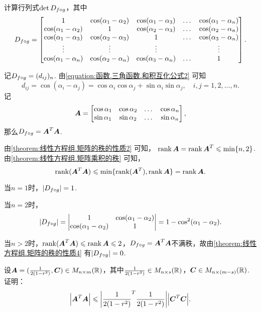 \begin{example}
计算行列式\(\det D_{f \circ g}\)，其中\[
D_{f \circ g} = \begin{bmatrix}
1 & \cos(\alpha_1-\alpha_2) & \cos(\alpha_1-\alpha_3) & \dots & \cos(\alpha_1-\alpha_n) \\
\cos(\alpha_1-\alpha_2) & 1 & \cos(\alpha_2-\alpha_3) & \dots & \cos(\alpha_2-\alpha_n) \\
\cos(\alpha_1-\alpha_3) & \cos(\alpha_2-\alpha_3) & 1 & \dots & \cos(\alpha_3-\alpha_n) \\
\vdots & \vdots & \vdots & & \vdots \\
\cos(\alpha_1-\alpha_n) & \cos(\alpha_2-\alpha_n) & \cos(\alpha_3-\alpha_n) & \dots & 1
\end{bmatrix}.
\]
\begin{solution}
记\(D_{f \circ g} = (d_{ij})_n\).
由\cref{equation:函数.三角函数.和积互化公式2} 可知\[
d_{ij} = \cos(\alpha_i-\alpha_j)
= \cos\alpha_i\cos\alpha_j+\sin\alpha_i\sin\alpha_j,
\quad i,j=1,2,\dotsc,n.
\]记\[
\boldsymbol{A} = \begin{bmatrix}
\cos\alpha_1 & \cos\alpha_2 & \dots & \cos\alpha_n \\
\sin\alpha_1 & \sin\alpha_2 & \dots & \sin\alpha_n
\end{bmatrix},
\]那么\(D_{f \circ g} = \boldsymbol{A}^T \boldsymbol{A}\).

由\cref{theorem:线性方程组.矩阵的秩的性质2} 可知，%
\(\rank\boldsymbol{A} = \rank\boldsymbol{A}^T \leqslant \min\{n,2\}\).
由\cref{theorem:线性方程组.矩阵乘积的秩} 可知，\[
\rank(\boldsymbol{A}^T\boldsymbol{A}) \leqslant \min\{\rank(\boldsymbol{A}^T),\rank\boldsymbol{A}\} = \rank\boldsymbol{A}.
\]

当\(n=1\)时，\(\abs{D_{f \circ g}}=1\).

当\(n=2\)时，\[
\abs{D_{f \circ g}} = \begin{vmatrix}
1 & \cos(\alpha_1-\alpha_2) \\
\cos(\alpha_1-\alpha_2) & 1
\end{vmatrix} = 1 - \cos^2(\alpha_1-\alpha_2).
\]

当\(n>2\)时，\(\rank(\boldsymbol{A}^T\boldsymbol{A}) \leqslant \rank\boldsymbol{A} \leqslant2\)，\(D_{f \circ g} = \boldsymbol{A}^T \boldsymbol{A}\)不满秩，故由\cref{theorem:线性方程组.矩阵的秩的性质4} 有\(\abs{D_{f \circ g}}=0\).
\end{solution}
\end{example}

\begin{example}
设\(\boldsymbol{A} = (\frac{1}{2(1-r^2)},\boldsymbol{C}) \in M_{n \times m}(\mathbb{R})\)，其中\(\frac{1}{2(1-r^2)} \in M_{n \times s}(\mathbb{R})\)，\(\boldsymbol{C} \in M_{n \times (m-s)}(\mathbb{R})\).
证明：\begin{equation}
\abs{\boldsymbol{A}^T \boldsymbol{A}} \leqslant \abs{\frac{1}{2(1-r^2)}^T \frac{1}{2(1-r^2)}} \abs{\boldsymbol{C}^T \boldsymbol{C}}.
\end{equation}
\end{example}

